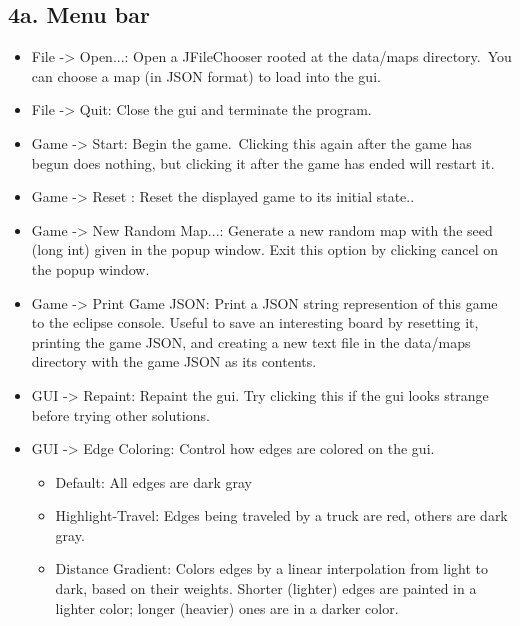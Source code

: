 \documentclass[11pt]{article}
\begin{document}
\subsection{4a. Menu bar}
\begin{itemize}
\item File -> Open...: Open a JFileChooser rooted at the data/maps directory.\ You can choose a map (in JSON format) to load into the gui.
\item File -> Quit:  Close the gui and terminate the program.
\item Game -> Start: Begin the game.\ Clicking this again after the game has begun does nothing, but clicking it after the game has ended will restart it.
\item Game -> Reset : Reset the displayed game to its initial state..
\item Game -> New Random Map...: Generate a new random map with the seed (long int) given in the popup window. Exit this option by clicking cancel on the popup window.
\item Game -> Print Game JSON: Print a JSON string represention of this game to the eclipse console. Useful to save an interesting board by resetting it, printing the game JSON, and creating a new text file in the data/maps directory with the game JSON as its contents.
\item GUI -> Repaint: Repaint the gui. Try clicking this if the gui looks strange before trying other solutions.
\item GUI -> Edge Coloring: Control how edges are colored on the gui.
\begin{itemize}
\item Default: All edges are dark gray
\item Highlight-Travel: Edges being traveled by a truck are red, others are dark gray.
\item Distance Gradient: Colors edges by a linear interpolation from light to dark, based on their weights. Shorter (lighter) edges are painted in a lighter color; longer (heavier) ones are in a  darker color.
\end{itemize}
\end{itemize}
\end{document}
